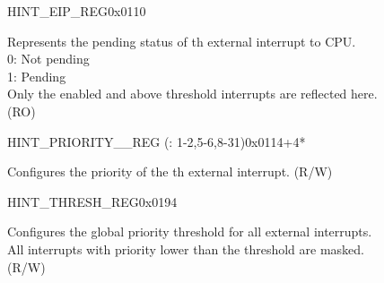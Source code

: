 \begin{register}{H}{INT\_EIP\_REG}{0x0110}\label{regdesc:INTEIPREG}
%
%
%
%
%
%
\regnewline%
\begin{regdesc}
\begin{reglist}
\item [INT\_EIP\lbrack\regindex{n}\rbrack] Represents the pending status of th external interrupt to CPU.\\
0: Not pending\\
1: Pending\\
Only the enabled and above threshold interrupts are reflected here.\\
(RO)
\end{reglist}
\end{regdesc}
\end{register}

\begin{register}{H}{INT\_PRIORITY\_\_REG (: 1-2,5-6,8-31)}{0x0114+4*}\label{regdesc:INTPRIORITYREG}
%
%
\regnewline%
\begin{regdesc}
\begin{reglist}
\label{fielddesc:INTPRIORITY}\item [INT\_PRIORITY\_\regindex{n}] Configures the priority of the th external interrupt. (R/W)
\end{reglist}
\end{regdesc}
\end{register}

\begin{register}{H}{INT\_THRESH\_REG}{0x0194}\label{regdesc:INTTHRESHREG}
%
%
\regnewline%
\begin{regdesc}
\begin{reglist}
\label{fielddesc:INTTHRESH}\item [INT\_THRESH] Configures the global priority threshold for all external interrupts. \\
All interrupts with priority lower than the threshold are masked. \\
(R/W)
\end{reglist}
\end{regdesc}
\end{register}
